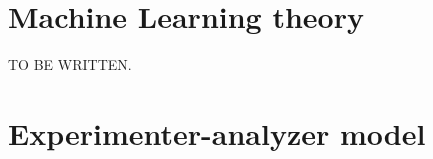 \documentclass[11pt,a4paper,twoside]{report}
\newcommand{\+}{\textnormal{+} }
\theoremstyle{definition}
\newtheorem{mydef}[mythm]{Definition}
\newtheorem{myex}[mythm]{Example}
\numberwithin{equation}{chapter}
\begin{document}






\chapter{Machine Learning theory} 

TO BE WRITTEN.

\chapter{Experimenter-analyzer model} \label{EAmodel}
\end{document}

